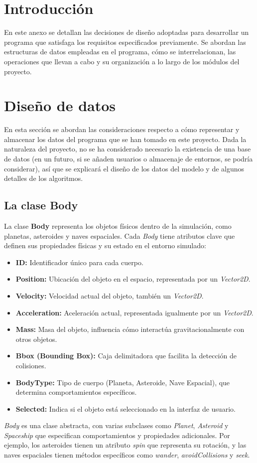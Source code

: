 \section{Introducción}
En este anexo se detallan las decisiones de diseño adoptadas para desarrollar un programa que satisfaga los requisitos especificados previamente. Se abordan las estructuras de datos empleadas en el programa, cómo se interrelacionan, las operaciones que llevan a cabo y su organización a lo largo de los módulos del proyecto.
\section{Diseño de datos}
En esta sección se abordan las consideraciones respecto a cómo representar y almacenar los datos del programa que se han tomado en este proyecto. Dada la naturaleza del proyecto, no se ha considerado necesario la existencia de una base de datos (en un futuro, si se añaden usuarios o almacenaje de entornos, se podría considerar), así que se explicará el diseño de los datos del modelo y de algunos detalles de los algoritmos.
\subsection{La clase Body}
La clase \textbf{Body} representa los objetos físicos dentro de la simulación, como planetas, asteroides y naves espaciales. Cada \textit{Body} tiene atributos clave que definen sus propiedades físicas y su estado en el entorno simulado:
\begin{itemize}
    \item \textbf{ID:} Identificador único para cada cuerpo.
    \item \textbf{Position:} Ubicación del objeto en el espacio, representada por un \textit{Vector2D}.
    \item \textbf{Velocity:} Velocidad actual del objeto, también un \textit{Vector2D}.
    \item \textbf{Acceleration:} Aceleración actual, representada igualmente por un \textit{Vector2D}.
    \item \textbf{Mass:} Masa del objeto, influencia cómo interactúa gravitacionalmente con otros objetos.
    \item \textbf{Bbox (Bounding Box):} Caja delimitadora que facilita la detección de colisiones.
    \item \textbf{BodyType:} Tipo de cuerpo (Planeta, Asteroide, Nave Espacial), que determina comportamientos específicos.
    \item \textbf{Selected:} Indica si el objeto está seleccionado en la interfaz de usuario.
\end{itemize}
\textit{Body} es una clase abstracta, con varias subclases como \textit{Planet}, \textit{Asteroid} y \textit{Spaceship} que especifican comportamientos y propiedades adicionales. Por ejemplo, los asteroides tienen un atributo \textit{spin} que representa su rotación, y las naves espaciales tienen métodos específicos como \textit{wander}, \textit{avoidCollisions} y \textit{seek}.
